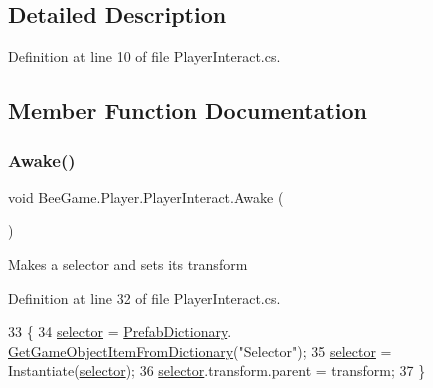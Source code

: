 \subsection{Detailed Description}


Definition at line 10 of file Player\+Interact.\+cs.



\subsection{Member Function Documentation}
\mbox{\label{class_bee_game_1_1_player_1_1_player_interact_a8f1c9ab307b82d47066e0d93f27bddbc}} 
\subsubsection{\texorpdfstring{Awake()}{Awake()}}
{\footnotesize\ttfamily void Bee\+Game.\+Player.\+Player\+Interact.\+Awake (\begin{DoxyParamCaption}{ }\end{DoxyParamCaption})\hspace{0.3cm}{\ttfamily [private]}}



Makes a selector and sets it\textquotesingle{}s transform 



Definition at line 32 of file Player\+Interact.\+cs.


\begin{DoxyCode}
33         \{
34             \hyperlink{class_bee_game_1_1_player_1_1_player_interact_ae6cde5e9d6378a1d750e442fecc9595e}{selector} = \hyperlink{class_bee_game_1_1_core_1_1_prefab_dictionary}{PrefabDictionary}.
      \hyperlink{class_bee_game_1_1_core_1_1_prefab_dictionary_a5435ea289663e612fc964438691e32d0}{GetGameObjectItemFromDictionary}(\textcolor{stringliteral}{"Selector"});
35             \hyperlink{class_bee_game_1_1_player_1_1_player_interact_ae6cde5e9d6378a1d750e442fecc9595e}{selector} = Instantiate(\hyperlink{class_bee_game_1_1_player_1_1_player_interact_ae6cde5e9d6378a1d750e442fecc9595e}{selector});
36             \hyperlink{class_bee_game_1_1_player_1_1_player_interact_ae6cde5e9d6378a1d750e442fecc9595e}{selector}.transform.parent = transform;
37         \}
\end{DoxyCode}
\mbox{\label{class_bee_game_1_1_player_1_1_player_interact_a3507c5b70c4aecb332338d518b691875}} 
